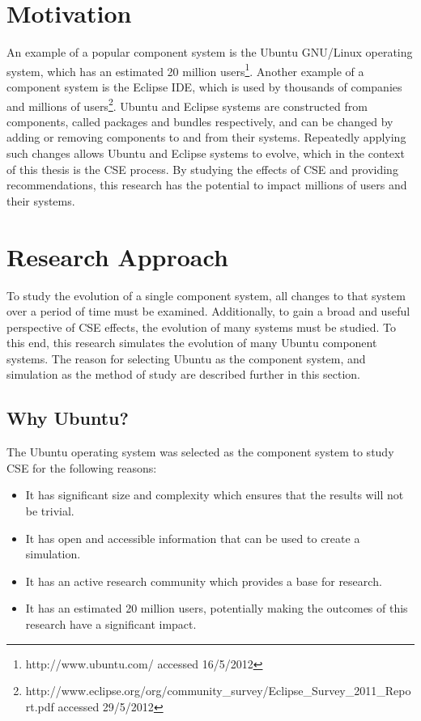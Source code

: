 \section{Motivation}
An example of a popular component system is the Ubuntu GNU/Linux operating system, which has an estimated 20 million users\footnote{http://www.ubuntu.com/ accessed 16/5/2012}. 
Another example of a component system is the Eclipse IDE, which is used by thousands of companies and millions of users\footnote{http://www.eclipse.org/org/community\_survey/Eclipse\_Survey\_2011\_Report.pdf  accessed 29/5/2012}.
Ubuntu and Eclipse systems are constructed from components, called packages and bundles respectively, 
and can be changed by adding or removing components to and from their systems.
Repeatedly applying such changes allows Ubuntu and Eclipse systems to evolve, which in the context of this thesis is the CSE process.
By studying the effects of CSE and providing recommendations, this research has the potential to impact millions of users and their systems.

\section{Research Approach}
To study the evolution of a single component system, all changes to that system over a period of time must be examined.
Additionally, to gain a broad and useful perspective of CSE effects, the evolution of many systems must be studied.
To this end, this research simulates the evolution of many Ubuntu component systems.
The reason for selecting Ubuntu as the component system, and simulation as the method of study are described further in this section.

\subsection{Why Ubuntu?}
The Ubuntu operating system was selected as the component system to study CSE for the following reasons:
\begin{itemize}
  \item It has significant size and complexity which ensures that the results will not be trivial.
  \item It has open and accessible information that can be used to create a simulation.
  \item It has an active research community which provides a base for research.
  \item It has an estimated 20 million users, potentially making the outcomes of this research have a significant impact.
\end{itemize} 

